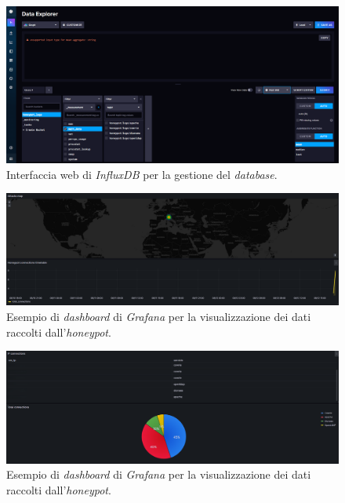 \begin{figure}[H]
    \begin{center}
    \includegraphics[width=\textwidth]{img/influxdb.png}
    \caption{Interfaccia web di \textit{InfluxDB} per la gestione del \textit{database}.}
    \label{fig:influxdb}
    \end{center}
\end{figure}
\begin{figure}[H]
    \begin{center}
    \includegraphics[width=\textwidth]{img/grafana-1.png}
    \caption{Esempio di \textit{dashboard} di \textit{Grafana} per la visualizzazione dei dati raccolti dall'\textit{honeypot}.}
    \label{fig:grafana-1}
    \end{center}
\end{figure}
\begin{figure}[H]
    \begin{center}
    \includegraphics[width=\textwidth]{img/grafana-2.png}
    \caption{Esempio di \textit{dashboard} di \textit{Grafana} per la visualizzazione dei dati raccolti dall'\textit{honeypot}.}
    \label{fig:grafana-2}
    \end{center}
\end{figure}
